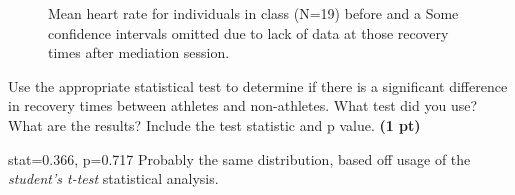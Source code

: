 \documentclass[12pt,a4paper]{article}
\begin{document}
\begin{enumerate}[font=\bfseries, wide, resume]
    \begin{figure}[h]
        \centering
        \caption{Mean heart rate for individuals in class (N=19) before and a Some confidence intervals omitted due to lack of data at those recovery times after mediation session.}
    \end{figure}
    {\color{under}\item Use the appropriate statistical test to determine if there is a significant difference in recovery times between athletes and non-athletes. What test did you use? What are the results? Include the test statistic and p value. \textbf{(1 pt)}}
    
    stat=0.366, p=0.717
    Probably the same distribution, based off usage of the \textit{student's t-test} statistical analysis.
    
\end{enumerate}
\end{document}

